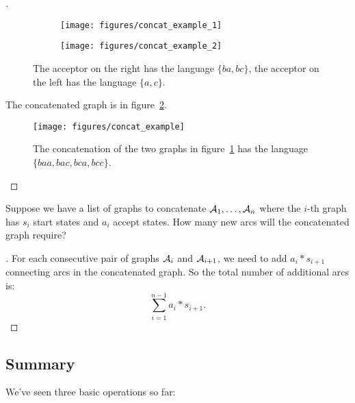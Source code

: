 \documentclass[main.tex]{subfiles}
\begin{document}
\begin{proof}[\unskip\nopunct]

\begin{figure}
    \centering
    \begin{subfigure}[b]{0.48\textwidth}
        \centering
        \texttt{[image: figures/concat\_example\_1]}
    \end{subfigure}
    \begin{subfigure}[b]{0.48\textwidth}
        \centering
        \texttt{[image: figures/concat\_example\_2]}
    \end{subfigure}
    \caption{The acceptor on the right has the language $\{ba, bc\}$, the
    acceptor on the left has the language $\{a, c\}$.}
    \label{fig:concat_example_inputs}
\end{figure}

The concatenated graph is in figure~\ref{fig:concat_example}.

\begin{figure}
    \centering
    \texttt{[image: figures/concat\_example]}
    \caption{The concatenation of the two graphs in
    figure~\ref{fig:concat_example_inputs} has the language $\{baa, bac, bca,
    bcc\}$.}
    \label{fig:concat_example}
\end{figure}

\end{proof}

\begin{example}
Suppose we have a list of graphs to concatenate $\mathcal{A}_1, \ldots, \mathcal{A}_n$ where the
$i$-th graph has $s_i$ start states and $a_i$ accept states. How many new
arcs will the concatenated graph require?
\end{example}

\begin{proof}[\unskip\nopunct]
For each consecutive pair of graphs $\mathcal{A}_i$ and $\mathcal{A}_{i+1}$, we need to add
$a_i * s_{i+1}$ connecting arcs in the concatenated graph. So the total
number of additional arcs is:
$$
\sum_{i=1}^{n-1} a_i * s_{i+1}.
$$
\end{proof}

\subsection{Summary}

We've seen three basic operations so far:
\end{document}
